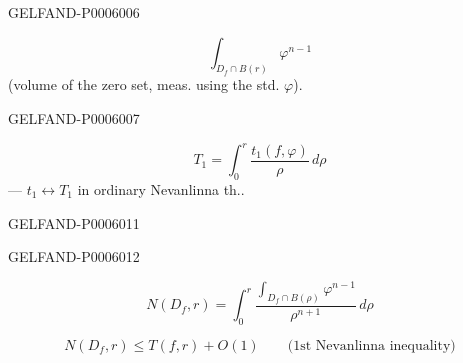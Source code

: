 \begin{GelfandAdjacentEvidence}{GELFAND-P000600}{6}

\[
\int_{D_f\cap B(r)}\varphi^{n-1}
\]
(volume of the zero set, meas. using the std. \(\varphi\)).
\end{GelfandAdjacentEvidence}
\begin{GelfandAdjacentEvidence}{GELFAND-P000600}{7}

\[
T_1=\int_0^r\frac{t_1(f,\varphi)}{\rho}\,d\rho
\]
— \(t_1\leftrightarrow T_1\) in ordinary Nevanlinna th..
\end{GelfandAdjacentEvidence}



\begin{GelfandAdjacentEvidence}{GELFAND-P000601}{1}
\end{GelfandAdjacentEvidence}
\begin{GelfandAdjacentEvidence}{GELFAND-P000601}{2}

\[
N(D_f,r)=\int_0^r
\frac{\displaystyle\int_{D_f\cap B(\rho)}\varphi^{n-1}}{\rho^{n+1}}\,d\rho
\]
\end{GelfandAdjacentEvidence}

\[
N(D_f,r)\le T(f,r)+O(1)\qquad\text{(1st Nevanlinna inequality)}
\]


